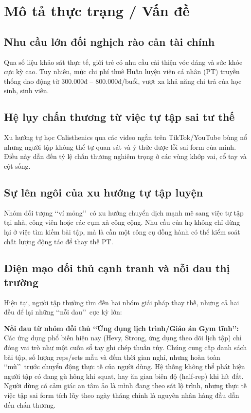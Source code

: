 \documentclass[a4paper,12pt]{article}
\begin{document}
\newpage
\tableofcontents
\newpage

\section{Mô tả thực trạng / Vấn đề}

\subsection{Nhu cầu lớn đối nghịch rào cản tài chính}
Qua số liệu khảo sát thực tế, giới trẻ có nhu cầu cải thiện vóc dáng và sức khỏe cực kỳ cao. Tuy nhiên, mức chi phí thuê Huấn luyện viên cá nhân (PT) truyền thống dao động từ 300.000đ -- 800.000đ/buổi, vượt xa khả năng chi trả của học sinh, sinh viên.

\subsection{Hệ lụy chấn thương từ việc tự tập sai tư thế}
Xu hướng tự học Calisthenics qua các video ngắn trên TikTok/YouTube bùng nổ nhưng người tập không thể tự quan sát và ý thức được lỗi sai form của mình. Điều này dẫn đến tỷ lệ chấn thương nghiêm trọng ở các vùng khớp vai, cổ tay và cột sống.

\subsection{Sự lên ngôi của xu hướng tự tập luyện}
Nhóm đối tượng \lq\lq ví mỏng\rq\rq\ có xu hướng chuyển dịch mạnh mẽ sang việc tự tập tại nhà, công viên hoặc các cụm xà công cộng. Nhu cầu của họ không chỉ dừng lại ở việc tìm kiếm bài tập, mà là cần một công cụ đồng hành có thể kiểm soát chất lượng động tác để thay thế PT.

\subsection{Diện mạo đối thủ cạnh tranh và nỗi đau thị trường}
Hiện tại, người tập thường tìm đến hai nhóm giải pháp thay thế, nhưng cả hai đều để lại những \lq\lq nỗi đau\rq\rq\ cực kỳ lớn:

\textbf{Nỗi đau từ nhóm đối thủ \lq\lq Ứng dụng lịch trình/Giáo án Gym tĩnh\rq\rq:} Các ứng dụng phổ biến hiện nay (Hevy, Strong, ứng dụng theo dõi lịch tập) chỉ đóng vai trò như một cuốn sổ tay ghi chép thuần túy. Chúng cung cấp danh sách bài tập, số lượng reps/sets mẫu và đếm thời gian nghỉ, nhưng hoàn toàn \lq\lq mù\rq\rq\ trước chuyển động thực tế của người dùng. Hệ thống không thể phát hiện người tập có đang gù hông khi squat, hay ăn gian biên độ (half-rep) khi hít đất. Người dùng có cảm giác an tâm ảo là mình đang theo sát lộ trình, nhưng thực tế việc tập sai form tích lũy theo ngày tháng chính là nguyên nhân hàng đầu dẫn đến chấn thương.
\end{document}
